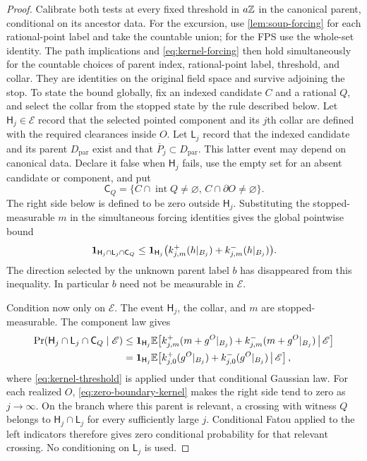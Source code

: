 \begin{proof}
Calibrate both tests at every fixed threshold in \(a\mathbb Z\) in the
canonical parent, conditional on its ancestor data. For the excursion,
use \cref{lem:soup-forcing} for each rational-point label and take
the countable union; for the FPS use the whole-set identity. The path
implications and \eqref{eq:kernel-forcing} then hold simultaneously
for the countable choices of parent index, rational-point label,
threshold, and collar.
They are identities on the original field space and survive adjoining
the stop. To state the bound globally, fix an indexed candidate \(C\)
and a rational \(Q\), and select the collar from the stopped state by
the rule described below. Let \(\mathsf H_j\in\mathscr E\) record that
the selected pointed component and its \(j\)th collar are defined with
the required clearances inside \(O\). Let \(\mathsf L_j\) record that
the indexed candidate and its parent \(D_{\mathrm{par}}\) exist and that
\(\overline P_j\subset D_{\mathrm{par}}\). This latter event may depend
on canonical data. Declare it false when \(\mathsf H_j\) fails, use the
empty set for an absent candidate or component, and put
\[
 \mathsf C_Q=\{C\cap\operatorname{int}Q\ne\varnothing,\,
                     C\cap\partial O\ne\varnothing\}.
\]
The right side below is defined to be zero outside \(\mathsf H_j\).
Substituting the stopped-measurable \(m\) in the simultaneous forcing
identities gives the global pointwise bound
\begin{equation}
 \mathbf 1_{\mathsf H_j\cap\mathsf L_j\cap\mathsf C_Q}
 \le \mathbf 1_{\mathsf H_j}
       \bigl(k_{j,m}^{+}(h|_{B_j})+k_{j,m}^{-}(h|_{B_j})\bigr).
 \label{eq:crossing-kernel-bound}
\end{equation}
The direction selected by the unknown parent label \(b\) has disappeared
from this inequality. In particular \(b\) need not be measurable in
\(\mathscr E\).

Condition now only on \(\mathscr E\). The event \(\mathsf H_j\), the
collar, and \(m\) are stopped-measurable. The component law gives
\begin{align*}
 \Pr(\mathsf H_j\cap\mathsf L_j\cap\mathsf C_Q\mid\mathscr E)
 &\le \mathbf 1_{\mathsf H_j}\mathbb E\!\left[
   k_{j,m}^{+}(m+g^O|_{B_j})+
   k_{j,m}^{-}(m+g^O|_{B_j})\,\middle|\,\mathscr E\right]
 \\&=
 \mathbf 1_{\mathsf H_j}\mathbb E\!\left[
   k_{j,0}^{+}(g^O|_{B_j})+
   k_{j,0}^{-}(g^O|_{B_j})\,\middle|\,\mathscr E\right],
\end{align*}
where \eqref{eq:kernel-threshold} is applied under that conditional
Gaussian law. For each realized \(O\), \eqref{eq:zero-boundary-kernel}
makes the right side tend to zero as \(j\to\infty\). On the branch where
this parent is relevant, a crossing with witness \(Q\) belongs to
\(\mathsf H_j\cap\mathsf L_j\) for every sufficiently large \(j\).
Conditional Fatou applied to the left indicators therefore gives zero
conditional probability for that relevant crossing. No conditioning
on \(\mathsf L_j\) is used.


\end{proof}
